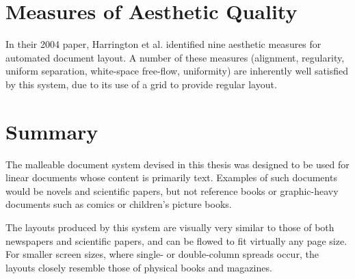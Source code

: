 \section{Measures of Aesthetic Quality}
In their 2004 paper, Harrington et al.\cite{Harrington2004} identified nine aesthetic measures for automated document layout. A number of these measures (alignment, regularity, uniform separation, white-space free-flow, uniformity) are inherently well satisfied by this system, due to its use of a grid to provide regular layout. 





\section{Summary}
The malleable document system devised in this thesis was designed to be used for linear documents whose content is primarily text. Examples of such documents would be novels and scientific papers, but not reference books or graphic-heavy documents such as comics or children's picture books.

The layouts produced by this system are visually very similar to those of both newspapers and scientific papers, and can be flowed to fit virtually any page size. For smaller screen sizes, where single- or double-column spreads occur, the layouts closely resemble those of physical books and magazines.

